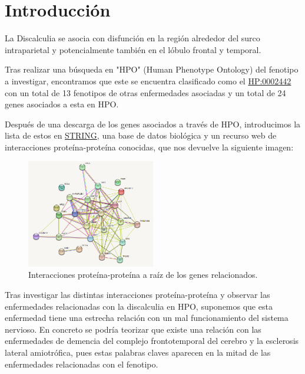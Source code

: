 \section{Introducción}

La Discalculia se asocia con disfunción en la región alrededor del surco intraparietal y potencialmente también en el lóbulo frontal y temporal.

\hfill

Tras realizar una búsqueda en "HPO" (Human Phenotype Ontology) del fenotipo a investigar, encontramos que este se encuentra clasificado como el \href{https://hpo.jax.org/app/browse/term/HP:0002442}{HP:0002442} con un total de 13 fenotipos de otras enfermedades asociadas y un total de 24 genes asociados a esta en HPO.

\hfill

Después de una descarga de los genes asociados a través de HPO, introducimos la lista de estos en \href{https://string-db.org/cgi/network?taskId=bhdt20FXsFkM&sessionId=bx1myVptKrEu}{STRING}, una base de datos biológica y un recurso web de interacciones proteína-proteína conocidas, que nos devuelve la siguiente imagen:

\begin{figure}[]
	\centering
	\includegraphics[width=0.50\textwidth]{figures/Gene-Relationships.PNG}
	\caption{Interacciones proteína-proteína a raíz de los genes relacionados. }
	\label{fig:example1}
\end{figure}


\hfill

Tras investigar las distintas interacciones proteína-proteína y observar las enfermedades relacionadas con la discalculia en HPO, suponemos que esta enfermedad tiene una estrecha relación con un mal funcionamiento del sistema nervioso. En concreto se podría teorizar que existe una relación con las enfermedades de demencia del complejo frontotemporal del cerebro y la esclerosis lateral amiotrófica, pues estas palabras claves aparecen en la mitad de las enfermedades relacionadas con el fenotipo.

